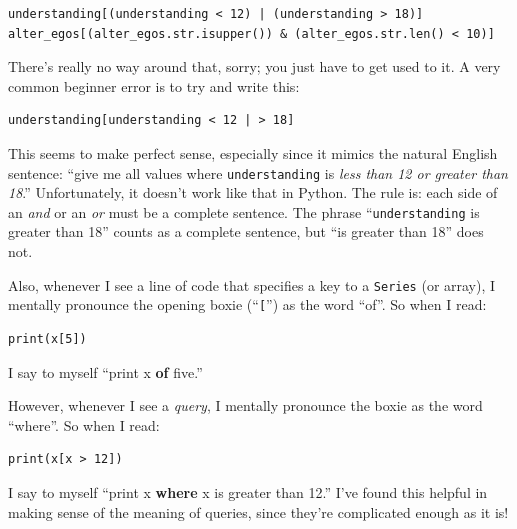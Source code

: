\begin{Verbatim}[fontsize=\CBCodeSmall,samepage=true,frame=single,framesep=3mm]
understanding[(understanding < 12) | (understanding > 18)]
alter_egos[(alter_egos.str.isupper()) & (alter_egos.str.len() < 10)]
\end{Verbatim}

There's really no way around that, sorry; you just have to get used to it. A
very common beginner error is to try and write this:

\begin{Verbatim}[fontsize=\small,samepage=true,frame=single,framesep=3mm]
understanding[understanding < 12 | > 18]
\end{Verbatim}

This seems to make perfect sense, especially since it mimics the natural
English sentence: ``give me all values where \texttt{understanding} is
\textit{less than 12 or greater than 18}.'' Unfortunately, it doesn't work like
that in Python. The rule is: each side of an \textsl{and} or an \textsl{or}
must be a complete sentence. The phrase ``\texttt{understanding} is greater
than 18'' counts as a complete sentence, but ``is greater than 18'' does not.


Also, whenever I see a line of code that specifies a key to a \texttt{Series}
(or array), I mentally pronounce the opening boxie (``\texttt{[}'') as the word
``of''. So when I read:

\begin{Verbatim}[fontsize=\small,samepage=true,frame=single,framesep=3mm]
print(x[5])
\end{Verbatim}
\vspace{-.2in}

I say to myself ``print x \textbf{of} five.''

However, whenever I see a \textit{query}, I mentally pronounce the 
boxie as the word ``where''. So when I read:

\begin{Verbatim}[fontsize=\small,samepage=true,frame=single,framesep=3mm]
print(x[x > 12])
\end{Verbatim}
\vspace{-.2in}

I say to myself ``print x \textbf{where} x is greater than 12.'' I've found
this helpful in making sense of the meaning of queries, since they're
complicated enough as it is!
